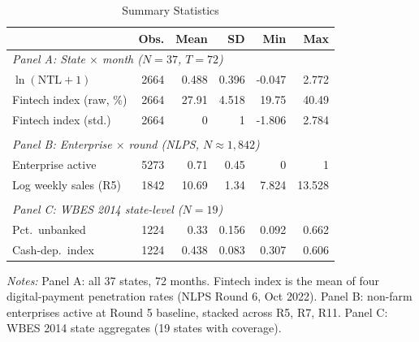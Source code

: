 \begin{table}[H]\begin{threeparttable}
\caption{Summary Statistics}\label{tab:summary}\small
\begin{tabular}{lrrrrr}\toprule
 & Obs. & Mean & SD & Min & Max \\\midrule
\multicolumn{6}{l}{\textit{Panel A: State $\times$ month ($N=37$, $T=72$)}} \\[3pt]
$\ln(\text{NTL}+1)$ & 2664 & 0.488 & 0.396 & -0.047 & 2.772 \\
Fintech index (raw, \%) & 2664 & 27.91 & 4.518 & 19.75 & 40.49 \\
Fintech index (std.) & 2664 & 0 & 1 & -1.806 & 2.784 \\
\\
\multicolumn{6}{l}{\textit{Panel B: Enterprise $\times$ round (NLPS, $N\approx1{,}842$)}} \\[3pt]
Enterprise active & 5273 & 0.71 & 0.45 & 0 & 1 \\
Log weekly sales (R5) & 1842 & 10.69 & 1.34 & 7.824 & 13.528 \\
\\
\multicolumn{6}{l}{\textit{Panel C: WBES 2014 state-level ($N=19$)}} \\[3pt]
Pct.\ unbanked & 1224 & 0.33 & 0.156 & 0.092 & 0.662 \\
Cash-dep.\ index & 1224 & 0.438 & 0.083 & 0.307 & 0.606 \\
\bottomrule\end{tabular}
\begin{tablenotes}\footnotesize
\item \textit{Notes:} Panel A: all 37 states, 72 months.
Fintech index is the mean of four digital-payment penetration rates (NLPS Round 6, Oct 2022).
Panel B: non-farm enterprises active at Round 5 baseline, stacked across R5, R7, R11.
Panel C: WBES 2014 state aggregates (19 states with coverage).
\end{tablenotes}\end{threeparttable}\end{table}
